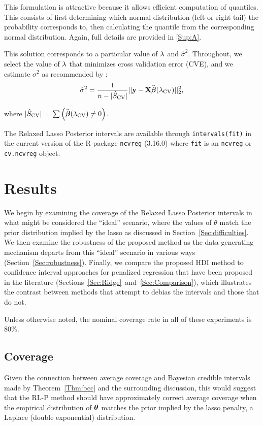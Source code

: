 This formulation is attractive because it allows efficient computation of quantiles. This consists of first determining which normal distribution (left or right tail) the probability corresponds to, then calculating the quantile from the corresponding normal distribution. Again, full details are provided in \ref{Sup:A}.

This solution corresponds to a particular value of $\lambda$ and $\hat{\sigma}^2$. Throughout, we select the value of $\lambda$ that minimizes cross validation error (CVE), and we estimate $\sigma^2$ as recommended by \citep{Reid2016}:
$$
\hat{\sigma}^2 = \frac{1}{n - |\hat{S}_{\textrm{CV}}|} ||\mathbf{y} - \mathbf{X}\widehat{\boldsymbol{\beta}}({\lambda_{\textrm{CV}}})||_2^2,
$$

\noindent where $|\hat{S}_{\textrm{CV}}|$ = $\sum \left( \widehat{\boldsymbol{\beta}}({\lambda_{\textrm{CV}}}) \neq 0 \right)$.

The Relaxed Lasso Posterior intervals are available through \texttt{intervals(fit)} in the current version of the R package \texttt{ncvreg} (3.16.0) where \texttt{fit} is an \texttt{ncvreg} or \texttt{cv.ncvreg} object.

\section{Results}
\label{Sec:results}

We begin by examining the coverage of the Relaxed Lasso Posterior intervals in what might be considered the ``ideal'' scenario, where the values of $\theta$ match the prior distribution implied by the lasso as discussed in Section~\ref{Sec:difficulties}. We then examine the robustness of the proposed method as the data generating mechanism departs from this ``ideal'' scenario in various ways (Section~\ref{Sec:robustness}). Finally, we compare the proposed HDI method to confidence interval approaches for penalized regression that have been proposed in the literature (Sections~\ref{Sec:Ridge}~and~\ref{Sec:Comparison}), which illustrates the contrast between methods that attempt to debias the intervals and those that do not.

Unless otherwise noted, the nominal coverage rate in all of these experiments is 80\%.

\subsection{Coverage}\label{Sec:coverage}

Given the connection between average coverage and Bayesian credible intervals made by Theorem~\ref{Thm:bcc} and the surrounding discussion, this would suggest that the RL-P method should have approximately correct average coverage when the empirical distribution of $\boldsymbol{\theta}$ matches the prior implied by the lasso penalty, a Laplace (double exponential) distribution.

